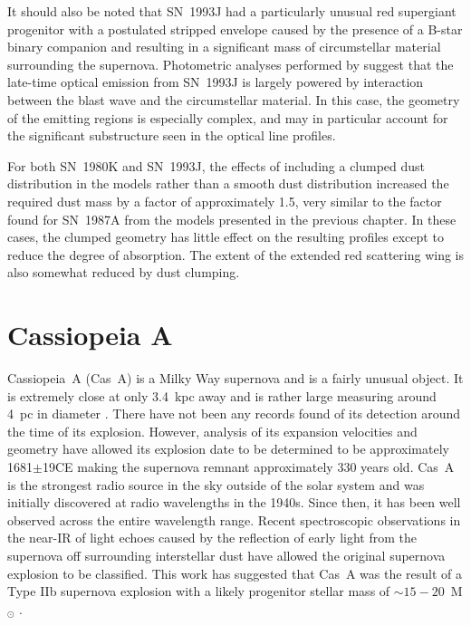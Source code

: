 It should also be noted that SN~1993J had a particularly unusual red supergiant progenitor with a postulated stripped envelope caused by the presence of a B-star binary companion \citep{Maund2004,Fox2014} and resulting in a significant mass of circumstellar material surrounding the supernova.  Photometric analyses performed by \citet{Zhang2004} suggest that the late-time optical emission from SN~1993J is largely powered by interaction between the blast wave and the circumstellar material.  In this case, the geometry of the emitting regions is especially complex, and may in particular account for the significant substructure seen in the optical line profiles.

For both SN~1980K and SN~1993J, the effects of including a clumped dust distribution in the models rather than a smooth dust distribution  increased the required dust mass by a factor of approximately 1.5, very similar to the factor found for SN~1987A from the models presented in the previous chapter.  In these cases, the clumped geometry has little effect on the resulting profiles except to reduce the degree of absorption.  The extent of the extended red scattering wing is also somewhat reduced by dust clumping.


\section{Cassiopeia A}
\label{CasA_intro}

Cassiopeia~A (Cas~A) is a Milky Way supernova and is a fairly unusual object.  It is extremely close at only 3.4~kpc away \citep{Reed1995} and is rather large measuring around 4~pc in diameter \citep{Hurford1996}.  There have not been any records found of its detection around the time of its explosion.  However, analysis of its expansion velocities and geometry have allowed its explosion date to be determined to be approximately 1681$\pm$19CE \citep{Fesen2006} making the supernova remnant approximately 330 years old.  Cas~A is the strongest radio source in the sky outside of the solar system and was initially discovered at radio wavelengths in the 1940s.  Since then, it has been well observed across the entire wavelength range.  Recent spectroscopic observations in the near-IR of light echoes caused by the reflection of early light from the supernova off surrounding interstellar dust have allowed the original supernova explosion to be classified.  This work has suggested that Cas~A was the result of a Type IIb supernova explosion with a likely progenitor stellar mass of $\sim15-20$~M$_{\odot}$ \citep{Krause2008}.

